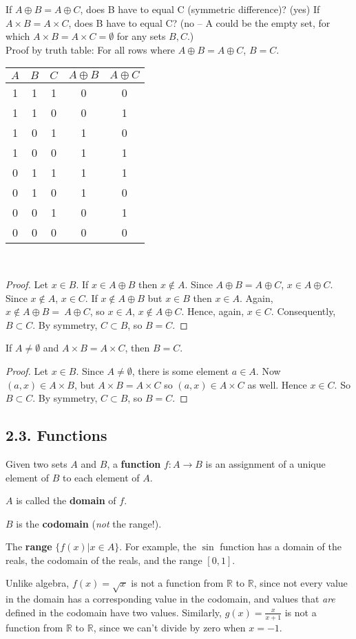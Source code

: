 \documentclass{article}
\theoremstyle{definition}
\begin{document}
If $A \oplus B = A \oplus C$, does B have to equal C (symmetric difference)? (yes)
If $A \times B = A \times C$, does B have to equal C? (no -- A could be the 
empty set, for which $A \times B = A \times C = \emptyset$ for any sets $B,C$.)\\

Proof by truth table: For all rows where $A \oplus B = A \oplus C$, $B=C$.

\begin{tabular}{ c|c|c|c|c }
  $A$ & $B$ & $C$ & $A \oplus B$ & $A \oplus C$\\
  \hline
  1 & 1 & 1 & 0 & 0\\
  1 & 1 & 0 & 0 & 1\\
  1 & 0 & 1 & 1 & 0\\
  1 & 0 & 0 & 1 & 1\\
  \hline
  0 & 1 & 1 & 1 & 1\\
  0 & 1 & 0 & 1 & 0\\
  0 & 0 & 1 & 0 & 1\\
  0 & 0 & 0 & 0 & 0
\end{tabular}\\

\begin{proof}
  Let $x \in B$. If $x \in A \oplus B$ then $x \notin A$. Since $A \oplus B =
  A \oplus C$, $x \in A \oplus C$. Since $x \notin A$, $x \in C$. If $x \notin
  A \oplus B$ but $x \in B$ then $x \in A$. Again, $x \notin A \oplus B =\
  A \oplus C$, so $x \in A$, $x \notin A \oplus C$. Hence, again, $x \in C$.
  Consequently, $B \subset C$. By symmetry, $C \subset B$, so $B=C$.
\end{proof}

If $A \neq \emptyset$ and $A \times B = A \times C$, then $B=C$.
\begin{proof}
  Let $x \in B$. Since $A \neq \emptyset$, there is some element $a \in A$.
  Now $(a,x) \in A \times B$, but $A \times B = A \times C$ so
  $(a,x) \in A \times C$ as well. Hence $x \in C$. So $B \subset C$.
  By symmetry, $C \subset B$, so $B = C$.
\end{proof}

\subsection*{2.3. Functions}

Given two sets $A$ and $B$, a \textbf{function} $f: A \to B$ is an assignment
of a unique element of $B$ to each element of $A$.

$A$ is called the \textbf{domain} of $f$.

$B$ is the \textbf{codomain} (\textit{not} the range!).

The \textbf{range} $\{f(x) | x \in A\}$. For example, the $\sin$ function
has a domain of the reals, the codomain of the reals, and the range $[0,1]$.

Unlike algebra, $f(x)=\sqrt{x}$ is not a function from $\mathbb{R}$ to
$\mathbb{R}$, since not every value in the domain has a corresponding value
in the codomain, and values that \textit{are} defined in the codomain have
two values. Similarly, $g(x) = \frac{x}{x+1}$ is not a function from
$\mathbb{R}$ to $\mathbb{R}$, since we can't divide by zero when $x=-1$.
\end{document}
